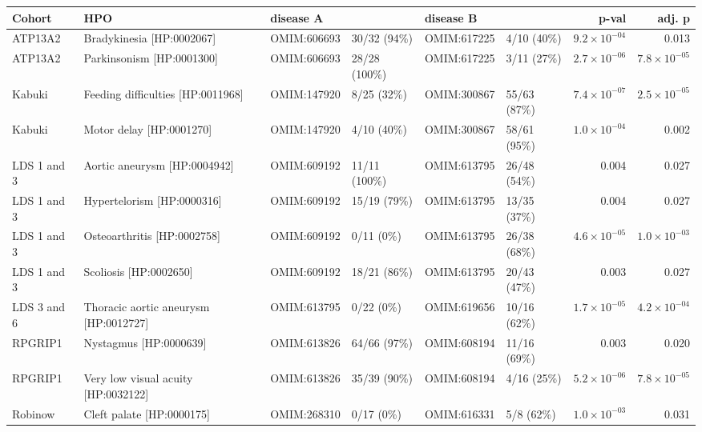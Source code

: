 \clearpage
\newpage


\clearpage
\newpage

\begin{table}
\centering
\begin{scriptsize}
\begin{tabular}{l>{\raggedright}p{2.5cm}llllrr}
\toprule
\textbf{Cohort} & \textbf{HPO} & \textbf{disease A} & \textbf{} & \textbf{disease B} & \textbf{} & \textbf{p-val} & \textbf{adj. p}\\
\midrule
ATP13A2 & Bradykinesia [HP:0002067] & OMIM:606693 & 30/32 (94\%) & OMIM:617225 & 4/10 (40\%) & $9.2 \times 10^{-04}$ & 0.013\\
ATP13A2 & Parkinsonism [HP:0001300] & OMIM:606693 & 28/28 (100\%) & OMIM:617225 & 3/11 (27\%) & $2.7 \times 10^{-06}$ & $7.8 \times 10^{-05}$\\
Kabuki & Feeding difficulties [HP:0011968] & OMIM:147920 & 8/25 (32\%) & OMIM:300867 & 55/63 (87\%) & $7.4 \times 10^{-07}$ & $2.5 \times 10^{-05}$\\
Kabuki & Motor delay [HP:0001270] & OMIM:147920 & 4/10 (40\%) & OMIM:300867 & 58/61 (95\%) & $1.0 \times 10^{-04}$ & 0.002\\
LDS 1 and 3 & Aortic aneurysm [HP:0004942] & OMIM:609192 & 11/11 (100\%) & OMIM:613795 & 26/48 (54\%) & 0.004 & 0.027\\
LDS 1 and 3 & Hypertelorism [HP:0000316] & OMIM:609192 & 15/19 (79\%) & OMIM:613795 & 13/35 (37\%) & 0.004 & 0.027\\
LDS 1 and 3 & Osteoarthritis [HP:0002758] & OMIM:609192 & 0/11 (0\%) & OMIM:613795 & 26/38 (68\%) & $4.6 \times 10^{-05}$ & $1.0 \times 10^{-03}$\\
LDS 1 and 3 & Scoliosis [HP:0002650] & OMIM:609192 & 18/21 (86\%) & OMIM:613795 & 20/43 (47\%) & 0.003 & 0.027\\
LDS 3 and 6 & Thoracic aortic aneurysm [HP:0012727] & OMIM:613795 & 0/22 (0\%) & OMIM:619656 & 10/16 (62\%) & $1.7 \times 10^{-05}$ & $4.2 \times 10^{-04}$\\
RPGRIP1 & Nystagmus [HP:0000639] & OMIM:613826 & 64/66 (97\%) & OMIM:608194 & 11/16 (69\%) & 0.003 & 0.020\\
RPGRIP1 & Very low visual acuity [HP:0032122] & OMIM:613826 & 35/39 (90\%) & OMIM:608194 & 4/16 (25\%) & $5.2 \times 10^{-06}$ & $7.8 \times 10^{-05}$\\
Robinow & Cleft palate [HP:0000175] & OMIM:268310 & 0/17 (0\%) & OMIM:616331 & 5/8 (62\%) & $1.0 \times 10^{-03}$ & 0.031\\

\end{tabular}
\end{scriptsize}
\end{table}
